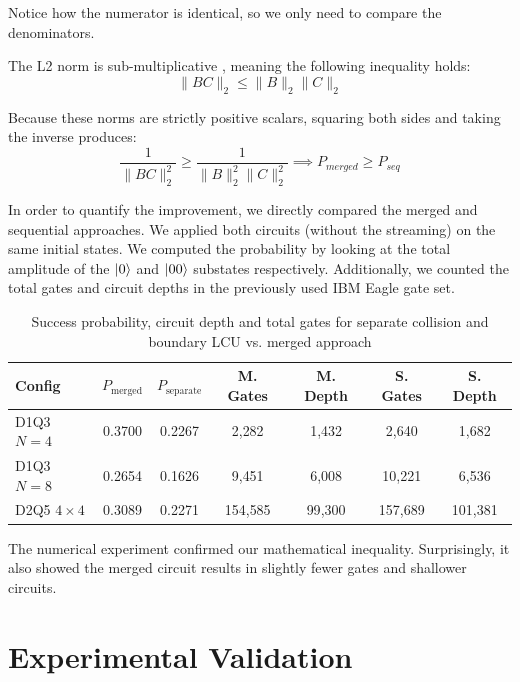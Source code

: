 Notice how the numerator is identical, so we only need to compare the denominators.

The L2 norm is sub-multiplicative \cite{horn2012matrix}, meaning the following inequality holds:
\begin{equation*}
    \|BC\|_2 \le \|B\|_2 \|C\|_2
\end{equation*}

Because these norms are strictly positive scalars, squaring both sides and taking the inverse produces:
\begin{equation*}
    \frac{1}{\|BC\|_2^2} \ge \frac{1}{\|B\|_2^2 \|C\|_2^2} \implies P_{merged} \ge P_{seq}
\end{equation*}


In order to quantify the improvement, we directly compared the merged and sequential approaches.
We applied both circuits (without the streaming) on the same initial states.
We computed the probability by looking at the total amplitude of the $\ket{0}$ and $\ket{00}$ substates respectively.
Additionally, we counted the total gates and circuit depths in the previously used IBM Eagle gate set.

\begin{table}[H]
\centering
\begin{tabular}{lcccccc}
\toprule
\textbf{Config} &
\textbf{$P_{\text{merged}}$} &
\textbf{$P_{\text{separate}}$} &
\textbf{M. Gates} &
\textbf{M. Depth} &
\textbf{S. Gates} &
\textbf{S. Depth} \\
\midrule
D1Q3 $N=4$      & 0.3700 & 0.2267 & 2{,}282  & 1{,}432 & 2{,}640  & 1{,}682 \\
D1Q3 $N=8$      & 0.2654 & 0.1626 & 9{,}451  & 6{,}008 & 10{,}221 & 6{,}536 \\
D2Q5 $4\times4$ & 0.3089 & 0.2271 & 154{,}585& 99{,}300& 157{,}689& 101{,}381\\
\bottomrule
\end{tabular}
\caption{Success probability, circuit depth and total gates for separate collision and boundary LCU vs. merged approach}
\label{tab:lcu-comparison}
\end{table}

The numerical experiment confirmed our mathematical inequality.
Surprisingly, it also showed the merged circuit results in slightly fewer gates and shallower circuits.

\section{Experimental Validation}
\label{sec:bc-validation}

